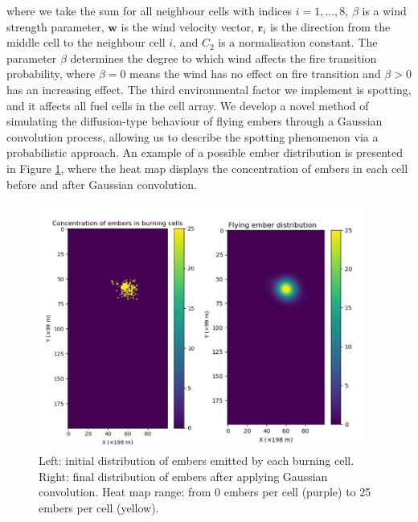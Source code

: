 \noindent where we take the sum for all neighbour cells with indices $i = 1,...,8$, $\beta$ is a wind strength parameter, $\mathbf{w}$ is the wind velocity vector, $\mathbf{r}_i$ is the direction from the middle cell to the neighbour cell $i$, and $C_2$ is a normalisation constant. The parameter $\beta$ determines the degree to which wind affects the fire transition probability, where $\beta=0$ means the wind has no effect on fire transition and $\beta>0$ has an increasing effect.\newline
\indent The third environmental factor we implement is spotting, and it affects all fuel cells in the cell array. We develop a novel method of simulating the diffusion-type behaviour of flying embers through a Gaussian convolution process, allowing us to describe the spotting phenomenon via a probabilistic approach. An example of a possible ember distribution is presented in Figure \ref{fig:emberFig}, where the heat map displays the concentration of embers in each cell before and after Gaussian convolution.

\begin{figure}[h]
\centering
    \includegraphics[width=0.95\textwidth]{Figures/embers_comp.png}
    \caption{Left: initial distribution of embers emitted by each burning cell. Right: final distribution of embers after applying Gaussian convolution. Heat map range: from 0 embers per cell (purple) to 25 embers per cell (yellow).}
    \label{fig:emberFig}
\end{figure}


